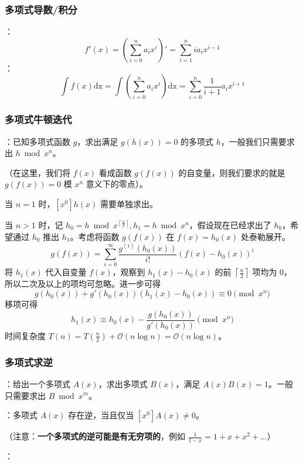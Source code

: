 \subsubsection{多项式导数/积分}

：
\[
f'(x) = \left( \sum\limits_{i = 0}^na_ix^i \right)' = \sum\limits_{i = 1}^n ia_ix^{i - 1}
\]
：
\[
\int f(x) \mathrm{dx} = \int \left( \sum\limits_{i = 0}^n a_ix^i \right) \mathrm{dx} = \sum\limits_{i = 0}^n \frac{1}{i + 1}a_ix^{i + 1}
\]

\subsubsection{多项式牛顿迭代}

：已知多项式函数 $g$，求出满足 $g(h(x)) = 0$ 的多项式 $h$，一般我们只需要求出 $h \bmod x^n$。

（在这里，我们将 $f(x)$ 看成函数 $g(f(x))$ 的自变量，则我们要求的就是 $g(f(x)) = 0$ 模 $x^n$ 意义下的零点）。

当 $n = 1$ 时，$[x^0]h(x)$ 需要单独求出。

当 $n > 1$ 时，记 $h_0 = h \bmod x^{\left\lceil \frac{n}{2} \right\rceil}, h_1 = h \bmod x^n$，假设现在已经求出了 $h_0$，希望通过 $h_0$ 推出 $h_1$。考虑将函数 $g(f(x))$ 在 $f(x) = h_0(x)$ 处泰勒展开。
\[
g(f(x)) = \sum\limits_{i = 0}^{\infty} \frac{g^{(i)}(h_0(x))}{i!}(f(x) - h_0(x))^i
\]
将 $h_1(x)$ 代入自变量 $f(x)$，观察到 $h_1(x) - h_0(x)$ 的前 $\left\lceil \frac{n}{2} \right\rceil$ 项均为 $0$，所以二次及以上的项均可忽略。进一步可得
\[
g(h_0(x)) + g'(h_0(x))\left( h_1(x) - h_0(x) \right) \equiv 0 \pmod{x^n}
\]
移项可得
\[
h_1(x) \equiv h_0(x) - \frac{g(h_0(x))}{g'(h_0(x))} \pmod{x^n}
\]
时间复杂度 $T(n) = T\left(\frac{n}{2}\right) + \mathcal{O}(n \log n) = \mathcal{O}(n \log n)$。

\subsubsection{多项式求逆}

：给出一个多项式 $A(x)$，求出多项式 $B(x)$，满足 $A(x)B(x) = 1$。一般只需要求出 $B \bmod{x^m}$。

：多项式 $A(x)$ 存在逆，当且仅当 $[x^0]A(x) \neq 0$。

（注意：\textbf{一个多项式的逆可能是有无穷项的}，例如 $\frac{1}{1 - x} = 1 + x + x^2 + \dots$）

：

